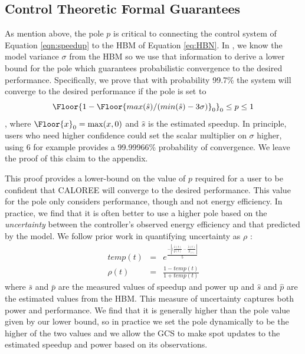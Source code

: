 \subsection{Control Theoretic Formal Guarantees}
\label{sec:guarantees}
As mention above, the pole $p$ is critical to connecting the control
system of Equation \ref{eqn:speedup} to the HBM of Equation
\ref{eq:HBN}.  In \SYSTEM{}, we know the model variance $\sigma$ from
the HBM so we use that information to derive a lower bound for the
pole which guarantees probabilistic convergence to the desired
performance. Specifically, we prove that with probability 99.7\% the
system will converge to the desired performance if the pole is set to
$$\Floor{1- \Floor{max(\hat{s})/(min(\hat{s}) - 3\sigma)}_0}_0 \leq p
\leq 1$$, where $\Floor{x}_0 = \max(x,0)$ and $\hat{s}$ is the
estimated speedup.  In principle, users who need higher confidence
could set the scalar multiplier on $\sigma$ higher, using $6$ for
example provides a 99.99966\% probability of convergence.  We leave
the proof of this claim to the appendix.

This proof provides a lower-bound on the value of $p$ required for a
user to be confident that CALOREE will converge to the desired
performance.  This value for the pole only considers performance,
though and not energy efficiency.  In practice, we find that it is
often better to use a higher pole based on the \emph{uncertainty}
between the controller's observed energy efficiency and that predicted
by the model.  We follow prior work in quantifying uncertainty as
$\rho$ \cite{Tokic2010}:
\begin{equation}
  \begin{array}{rcl}
    temp(t) &=& e^{\frac{- \left| (\frac{\bar{s}(t)}{\bar{p}(t)}  -\frac{ \hat{s}(t)}{\hat{p}_(t)} \right| }{5}} \\
    \rho(t) &=& \frac{1-temp(t)}{1+temp(t)} 
  \end{array}
  \label{eqn:uncer}
\end{equation}
where $\bar{s}$ and $\bar{p}$ are the measured values of speedup and
power up and $\hat{s}$ and $\hat{p}$ are the estimated values from the
HBM.  This measure of uncertainty captures both power and performance.
We find that it is generally higher than the pole value given by our
lower bound, so in practice we set the pole dynamically to be the
higher of the two values and we allow the GCS to make spot updates to
the estimated speedup and power based on its observations.  
